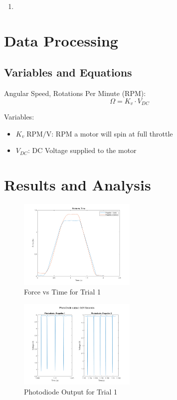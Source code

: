 \documentclass{article}
\begin{document}
\begin{enumerate}
  \item 
\end{enumerate}

\section{Data Processing}

\subsection{Variables and Equations}  

Angular Speed, Rotations Per Minute (RPM):
\begin{equation}
    \Omega = K_{v}\cdot V_{DC}
\end{equation}

Variables:
\begin{itemize}
    \item \(K_{v}\; \text{RPM/V}\):  RPM a motor will spin at full throttle
    \item \(V_{DC}\): DC Voltage supplied to the motor
\end{itemize}
\vspace{5mm}

\section{Results and Analysis}

\begin{figure}[H]
  \centering
  \includegraphics[width = 0.5\textwidth]{finalprojectimages/Trial1_ForcevTime.png}
  \caption{Force vs Time for Trial 1}
  \label{fig:forcevtime}
\end{figure}

\begin{figure}[H]
  \centering
  \includegraphics[width = 0.5\textwidth]{finalprojectimages/Trial1_PhotoDiode.png}
  \caption{Photodiode Output for Trial 1}
  \label{fig:photodiode}
\end{figure}
\end{document}
